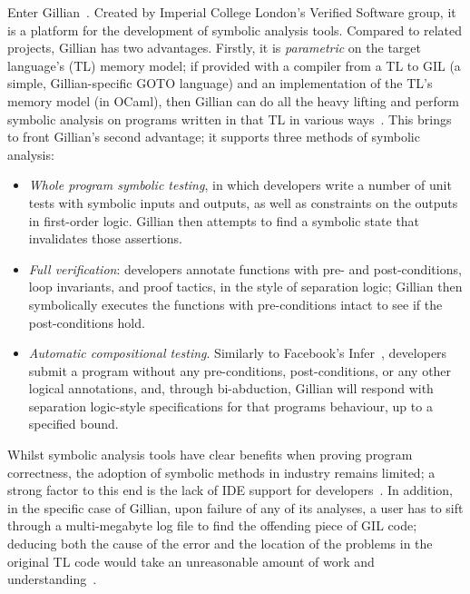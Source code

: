Enter Gillian~\cite{gillian-santos,gillian-part1,gillian-part2,gillian-techrep}. Created by Imperial College London's Verified Software group, it
is a platform for the development of symbolic analysis tools. Compared to
related projects, Gillian has two advantages.
Firstly, it is \textit{parametric} on the target language's (TL) memory model;
if provided with a compiler from a TL to GIL (a simple, Gillian-specific
GOTO language) and an implementation of the TL's memory model (in OCaml),
then Gillian can do all the heavy lifting and perform symbolic analysis on programs written in that
TL in various ways~\cite{gillian-part1}. This brings to front Gillian's second advantage; it supports three methods of symbolic
analysis:
\begin{itemize}
  \item \emph{Whole program symbolic testing}, in which developers write a
  number of unit tests with symbolic inputs and outputs, as well as constraints
  on the outputs in first-order logic. Gillian then attempts to find a symbolic
  state that invalidates those assertions.

  \item \emph{Full verification}: developers annotate functions with pre- and
  post-conditions, loop invariants, and proof tactics, in the style of
  separation logic; Gillian then symbolically executes the functions with
  pre-conditions intact to see if the post-conditions hold.

  \item \emph{Automatic compositional testing}. Similarly to Facebook's
  Infer~\cite{infer, infer-site}, developers submit a program without any
  pre-conditions, post-conditions, or any other logical annotations, and,
  through bi-abduction\cite{bi-abduction}, Gillian will respond with
  separation logic-style specifications for that programs behaviour, up
  to a specified bound.
\end{itemize}



Whilst symbolic analysis tools have clear benefits when proving program
correctness, the adoption of symbolic methods in industry remains limited; a
strong factor to this end is the lack of IDE support for
developers~\cite{magpiebridge}.
%
In addition, in the specific case of Gillian, upon failure of any of its analyses, 
a user has to sift through a multi-megabyte log file to
find the offending piece of GIL code; deducing both the cause of the error and
the location of the problems in the original TL code would take an
unreasonable amount of work and understanding~\cite{gillian-debugging-2021}.

